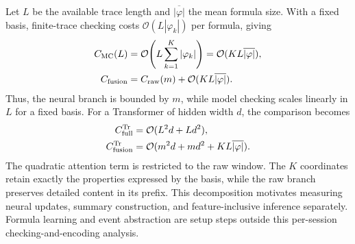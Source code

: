 \documentclass[sigconf,anonymous,nonacm]{acmart}
\newif\ifrevisions
\newcommand{\rev}[1]{\ifrevisions\textcolor{red}{#1}\else#1\fi}
\begin{document}
\rev{Let $L$ be the available trace length and $\overline{|\varphi|}$ the mean formula size. With a fixed basis, finite-trace checking costs $\mathcal O(L|\varphi_k|)$ per formula, giving
\begin{align}
C_{\rm MC}(L)&=\mathcal O\!\left(L\sum_{k=1}^K|\varphi_k|\right)
=\mathcal O(KL\overline{|\varphi|}),\label{eq:model_checking_cost}\\
C_{\rm fusion}&=C_{\rm raw}(m)+\mathcal O(KL\overline{|\varphi|}).\label{eq:dual_channel_cost}
\end{align}
Thus, the neural branch is bounded by $m$, while model checking scales linearly in $L$ for a fixed basis. For a Transformer of hidden width $d$, the comparison becomes
\begin{align}
C_{\rm full}^{\rm Tr}&=\mathcal O(L^2d+Ld^2),\notag\\
C_{\rm fusion}^{\rm Tr}&=\mathcal O(m^2d+md^2+KL\overline{|\varphi|}).\label{eq:transformer_dual_cost}
\end{align}
The quadratic attention term is restricted to the raw window. The $K$ coordinates retain exactly the properties expressed by the basis, while the raw branch preserves detailed content in its prefix. This decomposition motivates measuring neural updates, summary construction, and feature-inclusive inference separately. Formula learning and event abstraction are setup steps outside this per-session checking-and-encoding analysis.}
\end{document}
